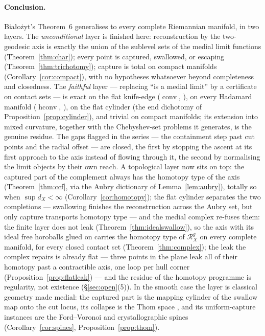 \documentclass[11pt]{article}
\theoremstyle{remark}
\newcommand{\X}{X}
\newcommand{\Rg}{\mathcal{R}^{g}_{\X}}
\newcommand{\dX}{d_{\X}}
\newcommand{\conv}{\operatorname{conv}}
\newcommand{\hconv}{\operatorname{hconv}}
\begin{document}
\paragraph{Conclusion.} Bia\l{}o\.zyt's Theorem~6 generalises to
every complete Riemannian manifold, in two layers. The
\emph{unconditional} layer is finished here: reconstruction by the
two-geodesic axis is exactly the union of the sublevel sets of the
medial limit functions (Theorem~\ref{thm:char}); every point is
captured, swallowed, or escaping (Theorem~\ref{thm:trichotomy});
capture is total on compact manifolds
(Corollary~\ref{cor:compact}), with no hypotheses whatsoever beyond
completeness and closedness. The \emph{faithful} layer --- replacing
``is a medial limit'' by a certificate on contact sets --- is exact
on the flat knife-edge ($\conv$, \cite{Bia}), on every Hadamard
manifold ($\hconv$, \cite{R3}), on the flat cylinder (the end
dichotomy of Proposition~\ref{prop:cylinder}), and trivial on
compact manifolds; its extension into mixed curvature, together with
the Chebyshev-set problems it generates, is the genuine residue. The gaps flagged in
the series --- the containment step past cut points and the radial
offset --- are closed, the first by stopping the ascent at its first
approach to the axis instead of flowing through it, the second by
normalising the limit objects by their own reach. A topological
layer now sits on top: the captured part of the complement always
has the homotopy type of the axis (Theorem~\ref{thm:ccf}, via the
Aubry dictionary of Lemma~\ref{lem:aubry}), totally so when
$\sup\dX<\infty$ (Corollary~\ref{cor:homotopy}); the flat cylinder
separates the two completions --- swallowing finishes the
reconstruction across the Aubry set, but only capture transports
homotopy type --- and the medial complex re-fuses them: the finite
layer does not leak (Theorem~\ref{thm:idealswallow}), so the axis
with its ideal free horoballs glued on carries the homotopy type of
$\Rg$ on every complete manifold, for every closed contact set
(Theorem~\ref{thm:complex}); the leak the complex repairs is
already flat --- three points in the plane leak all of their
homotopy past a contractible axis, one loop per hull corner
(Proposition~\ref{prop:flatleak}) --- and the residue of the
homotopy programme is regularity, not existence
(\S\ref{sec:open}(5)). In the smooth case the layer is classical geometry
made medial: the captured part is the mapping cylinder of the
swallow map onto the cut locus, its collapse is the Thom space
\cite{BP}, and its uniform-capture instances are the Ford--Voronoi
and crystallographic spines (Corollary~\ref{cor:spines},
Proposition~\ref{prop:thom}).
\end{document}
